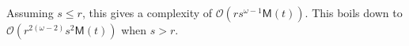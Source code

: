 \documentclass[acmtoms,acmnow]{acmtrans2m}
\def\M{\mathsf{M}} \def\I{\mathsf{I}} \def\R{\mathsf{R}} \def\Q{\mathbb{Q}}
\def\Mat{\mathcal{M}}
\def\bigO{{\ensuremath{\mathcal{O}}}}
\newcommand{\tmop}[1]{\ensuremath{\operatorname{#1}}}
\newcommand{\assign}{:=}
\newcommand{\rem}{\tmop{rem}}
\begin{document}
Assuming $s\leq r$, this gives a complexity of $\bigO(rs^{\omega-1}\M(t))$. This boils down to $\bigO(r^{2(\omega-2)}s^2\M(t))$ when $s>r$.
 





\end{document}

